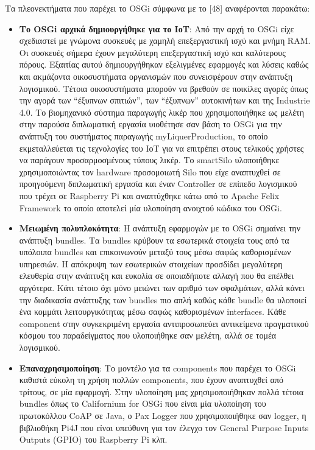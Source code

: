 	Τα πλεονεκτήματα που παρέχει το OSGi σύμφωνα με το [48] αναφέρονται παρακάτω: 
	
\begin{itemize}
	\item{\textbf{Το OSGi αρχικά δημιουργήθηκε για το ΙοΤ}: Από την αρχή το OSGi είχε σχεδιαστεί με γνώμονα συσκευές με χαμηλή επεξεργαστική ισχύ και μνήμη RAM. Οι συσκευές σήμερα  έχουν μεγαλύτερη επεξεργαστική ισχύ και καλύτερους πόρους. Εξαιτίας αυτού δημιουργήθηκαν εξελιγμένες εφαρμογές και λύσεις καθώς και ακμάζοντα οικοσυστήματα οργανισμών που συνεισφέρουν στην ανάπτυξη λογισμικού. Τέτοια οικοσυστήματα μπορούν να βρεθούν σε ποικίλες αγορές όπως την αγορά των “έξυπνων σπιτιών”, των “έξυπνων” αυτοκινήτων και της Industrie 4.0. Το βιομηχανικό σύστημα παραγωγής λικέρ που χρησιμοποιήθηκε ως μελέτη στην παρούσα διπλωματική εργασία υιοθέτησε σαν βάση το OSGi για την ανάπτυξη του συστήματος παραγωγής myLiquerProduction, το οποίο εκμεταλλεύεται τις τεχνολογίες του ΙοΤ για να επιτρέπει στους τελικούς χρήστες να παράγουν προσαρμοσμένους τύπους λικέρ. Το smartSilo υλοποιήθηκε χρησιμοποιώντας τον hardware προσομοιωτή Silo που είχε αναπτυχθεί σε προηγούμενη διπλωματική εργασία και έναν Controller σε επίπεδο λογισμικού που τρέχει σε Raspberry Pi και αναπτύχθηκε κάτω από το Apache Felix Framework το οποίο αποτελεί μία υλοποίηση ανοιχτού κώδικα του OSGi. }
	\item{\textbf{Μειωμένη πολυπλοκότητα}: Η ανάπτυξη εφαρμογών με το OSGi σημαίνει την ανάπτυξη bundles. Τα bundles κρύβουν τα εσωτερικά στοιχεία τους από τα υπόλοιπα bundles και επικοινωνούν μεταξύ τους μέσω σαφώς καθορισμένων υπηρεσιών. Η απόκρυψη των εσωτερικών στοιχείων προσδίδει μεγαλύτερη ελευθερία στην ανάπτυξη και ευκολία σε οποιαδήποτε αλλαγή που θα επέλθει αργότερα. Κάτι τέτοιο όχι μόνο μειώνει των αριθμό των σφαλμάτων, αλλά κάνει την διαδικασία ανάπτυξης των bundles πιο απλή καθώς κάθε bundle θα υλοποιεί ένα κομμάτι λειτουργικότητας μέσω σαφώς καθορισμένων interfaces. Κάθε component στην συγκεκριμένη εργασία αντιπροσωπεύει αντικείμενα πραγματικού κόσμου του παραδείγματος που υλοποιήθηκε σαν μελέτη, αλλά σε τομέα λογισμικού.}
	\item{\textbf{Επαναχρησιμοποίηση}: Το μοντέλο για τα components που παρέχει το OSGi καθιστά εύκολη τη χρήση πολλών components, που έχουν αναπτυχθεί από τρίτους, σε μία εφαρμογή. Στην υλοποίηση μας χρησιμοποιήθηκαν πολλά τέτοια bundles όπως το Californium for OSGi που είναι μία υλοποίηση του πρωτοκόλλου CoAP σε Java, ο Pax Logger που χρησιμοποιήθηκε σαν logger, η βιβλιοθήκη Pi4J που είναι υπεύθυνη για τον έλεγχο τον General Purpose Inputs Outputs (GPIO) του Raspberry Pi κλπ. }

\end{itemize}
